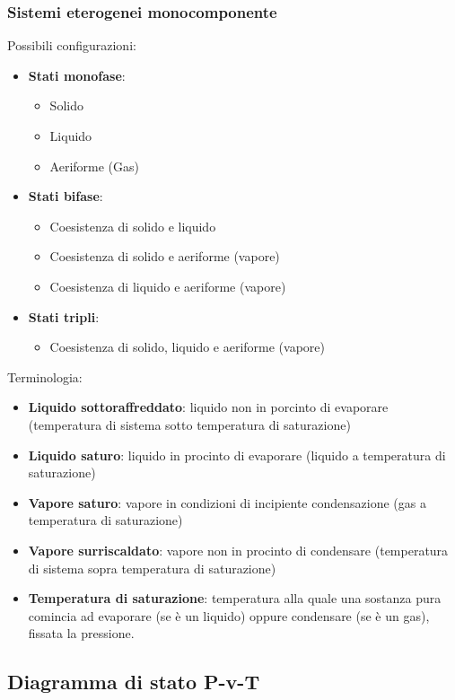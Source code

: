 \subsubsection{Sistemi eterogenei monocomponente}
Possibili configurazioni:
\begin{itemize}
    \item \textbf{Stati monofase}:
    \begin{itemize}
        \item Solido
        \item Liquido 
        \item Aeriforme (Gas)
    \end{itemize}
    \item \textbf{Stati bifase}:
    \begin{itemize}
        \item Coesistenza di solido e liquido
        \item Coesistenza di solido e aeriforme (vapore)
        \item Coesistenza di liquido e aeriforme (vapore)
    \end{itemize}
    \item \textbf{Stati tripli}:
    \begin{itemize}
        \item Coesistenza di solido, liquido e aeriforme (vapore)
    \end{itemize}
\end{itemize}
Terminologia:
\begin{itemize}
    \item \textbf{Liquido sottoraffreddato}: liquido non in porcinto di evaporare (temperatura di sistema sotto temperatura di saturazione)
    \item \textbf{Liquido saturo}: liquido in procinto di evaporare (liquido a temperatura di saturazione)
    \item \textbf{Vapore saturo}: vapore in condizioni di incipiente condensazione (gas a temperatura di saturazione)
    \item \textbf{Vapore surriscaldato}: vapore non in procinto di condensare (temperatura di sistema sopra temperatura di saturazione)
    \item \textbf{Temperatura di saturazione}: temperatura alla quale una sostanza pura comincia ad evaporare (se è un liquido) oppure condensare (se è un gas), fissata la pressione.
\end{itemize}
\subsection{Diagramma di stato P-v-T}
